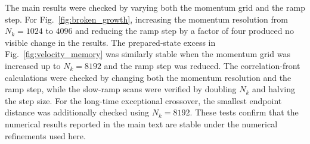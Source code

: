 \documentclass[aps,prb,reprint,superscriptaddress,amsmath,amssymb,floatfix]{revtex4-2}
\begin{document}
The main results were checked by varying both the momentum grid and the
ramp step. For Fig.~\ref{fig:broken_growth}, increasing the momentum
resolution from $N_k=1024$ to $4096$ and reducing the ramp step by a
factor of four produced no visible change in the results. The prepared-state
excess in Fig.~\ref{fig:velocity_memory} was similarly stable when the
momentum grid was increased up to $N_k=8192$ and the ramp step was reduced.
The correlation-front calculations were checked by changing both the
momentum resolution and the ramp step, while the slow-ramp scans were
verified by doubling $N_k$ and halving the step size. For the long-time
exceptional crossover, the smallest endpoint distance was additionally
checked using $N_k=8192$. These tests confirm that the numerical results
reported in the main text are stable under the numerical refinements used
here.




\end{document}
